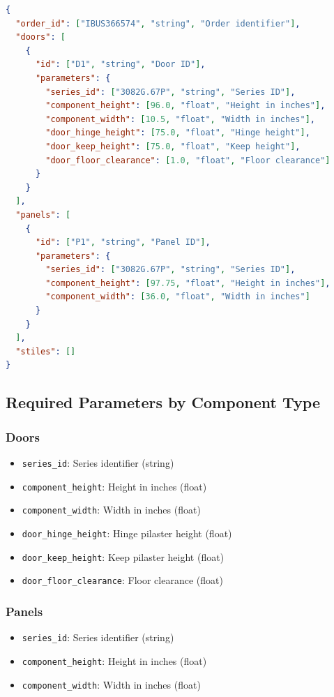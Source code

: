 \documentclass[11pt,letterpaper]{article}
\begin{document}
\begin{lstlisting}[language=json,caption={Example Order: IBUS366574.json}]
{
  "order_id": ["IBUS366574", "string", "Order identifier"],
  "doors": [
    {
      "id": ["D1", "string", "Door ID"],
      "parameters": {
        "series_id": ["3082G.67P", "string", "Series ID"],
        "component_height": [96.0, "float", "Height in inches"],
        "component_width": [10.5, "float", "Width in inches"],
        "door_hinge_height": [75.0, "float", "Hinge height"],
        "door_keep_height": [75.0, "float", "Keep height"],
        "door_floor_clearance": [1.0, "float", "Floor clearance"]
      }
    }
  ],
  "panels": [
    {
      "id": ["P1", "string", "Panel ID"],
      "parameters": {
        "series_id": ["3082G.67P", "string", "Series ID"],
        "component_height": [97.75, "float", "Height in inches"],
        "component_width": [36.0, "float", "Width in inches"]
      }
    }
  ],
  "stiles": []
}
\end{lstlisting}

\subsection{Required Parameters by Component Type}

\subsubsection{Doors}

\begin{itemize}[noitemsep]
    \item \texttt{series\_id}: Series identifier (string)
    \item \texttt{component\_height}: Height in inches (float)
    \item \texttt{component\_width}: Width in inches (float)
    \item \texttt{door\_hinge\_height}: Hinge pilaster height (float)
    \item \texttt{door\_keep\_height}: Keep pilaster height (float)
    \item \texttt{door\_floor\_clearance}: Floor clearance (float)
\end{itemize}

\subsubsection{Panels}

\begin{itemize}[noitemsep]
    \item \texttt{series\_id}: Series identifier (string)
    \item \texttt{component\_height}: Height in inches (float)
    \item \texttt{component\_width}: Width in inches (float)
\end{itemize}
\end{document}
